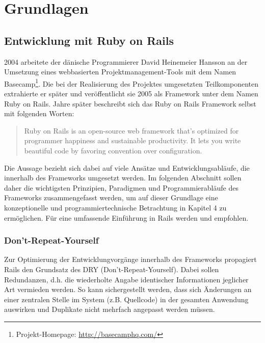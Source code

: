 \chapter{Grundlagen}

\section{Entwicklung mit Ruby on Rails}

2004 arbeitete der dänische Programmierer David Heinemeier Hansson an der Umsetzung eines webbasierten Projektmanagement-Tools mit dem Namen Basecamp\footnote{Projekt-Homepage: \href{http://basecamphq.com/}{http://basecamphq.com/}}. Die bei der Realisierung des Projektes umgesetzten Teilkomponenten extrahierte er später und veröffentlicht sie 2005 als Framework unter dem Namen Ruby on Rails.
\newline
{} Jahre später beschreibt sich das Ruby on Rails Framework selbst mit folgenden Worten:
\begin{quote}
Ruby on Rails is an open-source web framework that’s
optimized for programmer happiness and sustainable
productivity. It lets you write beautiful code by
favoring convention over configuration.
\end{quote}

Die Aussage bezieht sich dabei auf viele Ansätze und Entwicklungsabläufe, die innerhalb des Frameworks umgesetzt werden.
Im folgenden Abschnitt sollen daher die wichtigsten Prinzipien, Paradigmen und Programmierabläufe des Frameworks zusammengefasst werden, um auf dieser Grundlage eine konzeptionelle und programmiertechnische Betrachtung in Kapitel 4 zu ermöglichen.
\newline
\newline
Für eine umfassende Einführung in Rails werden \cite{RubyMetaprogramming2010} und \cite{EnterpriseRails} empfohlen.

\subsection{Don't-Repeat-Yourself}
Zur Optimierung der Entwicklungvorgänge innerhalb des Frameworks propagiert Rails den Grundsatz des DRY (Don't-Repeat-Yourself). Dabei sollen Redundanzen, d.h. die wiederholte Angabe identischer Informationen jeglicher Art vermieden werden. So kann sichergestellt werden, dass sich Änderungen an einer zentralen Stelle im System (z.B. Quellcode) in der gesamten Anwendung auswirken und Duplikate nicht mehrfach angepasst werden müssen.
